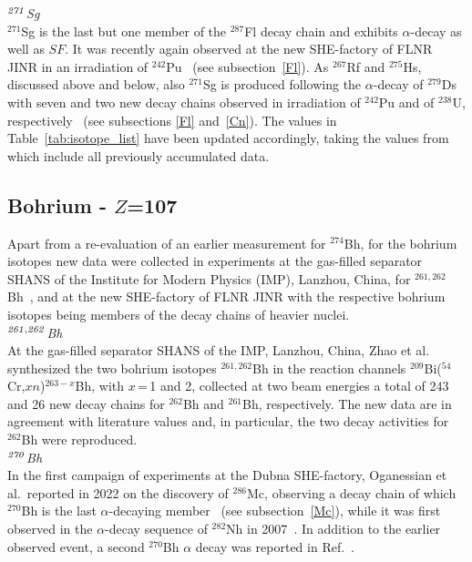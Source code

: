 {\it $^{\it271}$Sg}\\
$^{271}$Sg is the last but one member of the $^{287}$Fl decay chain and exhibits $\alpha$-decay as well as $SF$. It was recently again observed at the new SHE-factory of FLNR JINR in an irradiation of $^{242}$Pu~\cite{Oganessian2022b} (see subsection~\ref{Fl}). 
As $^{267}$Rf and $^{275}$Hs, discussed above and below, also $^{271}$Sg is produced following the $\alpha$-decay of $^{279}$Ds with seven and two new decay chains observed in irradiation of $^{242}$Pu and of $^{238}$U, respectively~\cite{Oganessian2022b} (see subsections \ref{Fl} and~\ref{Cn}).
The values in Table~\ref{tab:isotope_list} have been updated accordingly, taking the values from~\cite{Oganessian2022b} which include all previously accumulated data.


\subsection{Bohrium - $Z$=107}\label{Bh}

Apart from a re-evaluation of an earlier measurement for $^{274}$Bh, for the bohrium isotopes new data were collected in experiments at the gas-filled separator SHANS of the Institute for Modern Physics (IMP), Lanzhou, China, for $^{261,262}$Bh~\cite{ZhaoZ2024}, and at the new SHE-factory of FLNR JINR with the respective bohrium isotopes being members of the decay chains of heavier nuclei.\\ 


{\it $^{\it261,262}$Bh}\\
At the gas-filled separator SHANS of the IMP, Lanzhou, China, Zhao et al.~ synthesized the two bohrium isotopes $^{261,262}$Bh in the reaction channels $^{209}$Bi($^{54}$Cr,$xn$)$^{263-x}$Bh, with $x$\,=\,1 and 2, collected at two beam energies a total of 243 and 26 new decay chains for $^{262}$Bh and $^{261}$Bh, respectively. The new data are in agreement with literature values and, in particular, the two decay activities for $^{262}$Bh were reproduced. \\ 


{\it $^{\it270}$Bh}\\
In the first campaign of experiments at the Dubna SHE-factory, Oganessian et al.~reported in 2022 on the discovery of $^{286}$Mc, observing a decay chain of which $^{270}$Bh is the last $\alpha$-decaying member~\cite{Oganessian2022d} (see subsection~\ref{Mc}), while it was first observed in the $\alpha$-decay sequence of $^{282}$Nh in 2007~\cite{Oganessian2007b}. 
In addition to the earlier observed event, a second $^{270}$Bh $\alpha$ decay was reported in Ref.~\cite{Oganessian2022d}.\\

